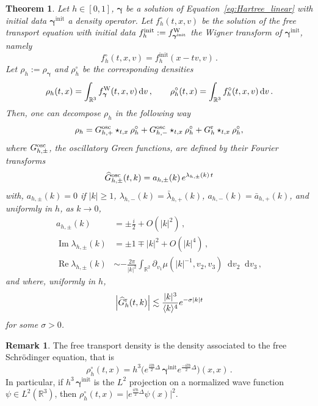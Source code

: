 \documentclass[a4paper,12pt]{amsart} %
\theoremstyle{plain}
\newtheorem{thm}{Theorem}[section]
\theoremstyle{definition}
\newtheorem{remark}{Remark}[section]
\newcommand		{\RR}		{\mathbb R}			%
\newcommand		{\R}		{\RR}
\newcommand		{\Rd}		{\R^3}
\newcommand		{\hd}		{h^3}
\newcommand		{\lt}			{\left}				%
\newcommand		{\rt}			{\right}			%
\renewcommand	{\(}			{\lt(}
\renewcommand	{\)}			{\rt)}
\newcommand		{\n}[1]			{\lt\lvert{#1}\rt\rvert}	%
\newcommand		{\sabs}[1]		{\lvert{#1}\rvert}
\renewcommand		{\d}		{\mathop{}\!\mathrm{d}}		%
\DeclareMathOperator{\re}		{Re}				%
\DeclareMathOperator{\im}		{Im}				%
\renewcommand	{\Im}[1]		{\im\!\( #1 \)}		%
\newcommand		{\intd}			{\int_{\Rd}}
\newcommand		{\init}			{\mathrm{init}}
\newcommand	{\h}			{h}
\newcommand		{\opgam}		{{\boldsymbol{\gamma}}}
\newcommand		{\op}			{\opgam}	%
\newcommand	 {\Wigner}[1]		{f^\textnormal{W}_{#1}}
\newcommand		{\Gr}			{G^{\textnormal{r}}}
\newcommand		{\Gosc}			{G^{\textnormal{osc}}}
\newcommand		{\hatG}			{\widehat{G}}
\newcommand		{\hatGr}		{\hatG^{\textnormal{r}}}
\newcommand		{\hatGosc}		{\hatG^{\textnormal{osc}}}
\begin{document}
	\begin{thm}\label{thm:Green_functions}
		Let $h\in[0,1]$, $\op$ be a solution of Equation~\eqref{eq:Hartree_linear} with initial data $\op^{\init}$ a density operator. Let $f_h^\circ(t,x,v)$ be the solution of the free transport equation with initial data $f_h^\init := \Wigner{\op^\init}$ the Wigner transform of $\op^\init$, namely
		\begin{equation*}
			f_h^\circ(t,x,v) = f_h^\init(x - tv,v) \, .
		\end{equation*}
		Let $\rho_\h := \rho_\op$ and $\rho_\h^\circ$ be the corresponding densities
		\begin{equation*}
			\rho_\h(t,x) = \intd \Wigner{\op}(t,x,v) \d v\, , \qquad \rho_\h^\circ(t,x) = \intd f_h^\circ(t,x,v) \d v \, .
		\end{equation*}
		Then, one can decompose $\rho_\h$ in the following way
		\begin{equation*} %
			\rho_\h = \Gosc_{\h,+} \star_{t,x} \rho_\h^\circ + \Gosc_{\h,-} \star_{t,x} \rho_\h^\circ + \Gr_\h \star_{t,x} \rho_\h^\circ ,
		\end{equation*}
		where $\Gosc_{\h,\pm}$, the oscillatory Green functions, are defined by their Fourier transforms
		\begin{equation*}
			\hatGosc_{\h,\pm}(t,k) = a_{\h,\pm}(k)\, e^{\lambda_{\h,\pm}(k) \,t}
		\end{equation*}
		with, $a_{\h,\pm}(k) = 0$ if $\n{k} \ge 1$, $\lambda_{\h,-}(k) = \bar \lambda_{\h,+}(k)$, $a_{\h,-}(k) = \bar a_{\h,+}(k)$, and uniformly in $\h$, as $k \to 0$,
		\begin{align*}
			a_{\h,\pm}(k) &= \pm \frac{i}{2} + O(\n{k}^2) \, ,
			\\
			\im \lambda_{\h,\pm}(k) &= \pm 1 \mp \n{k}^2 + O(\n{k}^4) \, ,
			\\
			\re \lambda_{\h,\pm}(k) &\sim - \frac{2 \pi}{\n{k}^2} \int_{\mathbb{R}^2} \partial_{v_1} \mu\!\lt( \n{k}^{-1},v_2,v_3 \rt) \d v_2 \d v_3 \, ,
		\end{align*}
		and where, uniformly in $\h$,
		\begin{equation*} %
			\n{\hatGr_\h(t,k)} \lesssim {|k|^3 \over \langle k \rangle^4} e^{- \sigma \n{k} t} 
		\end{equation*}
		for some $\sigma > 0$.
	\end{thm}

	\begin{remark}
		The free transport density is the density associated to the free Schrödinger equation, that is
		\begin{equation*}
			\rho_\h^\circ(t,x) = \hd \bigl(e^{\frac{it \hbar}{2}\Delta}\, \op^\init e^{\frac{-it \hbar}{2}\Delta}\bigr)(x,x) \, .
		\end{equation*}
		In particular, if $\hd \, \op^\init$ is the $L^2$ projection on a normalized wave function $\psi \in L^2(\Rd)$, then $\rho_\h^\circ(t,x) = \sabs{e^{\frac{it \hbar}{2}\Delta}\psi(x)}^2$.
	\end{remark}
\end{document}

